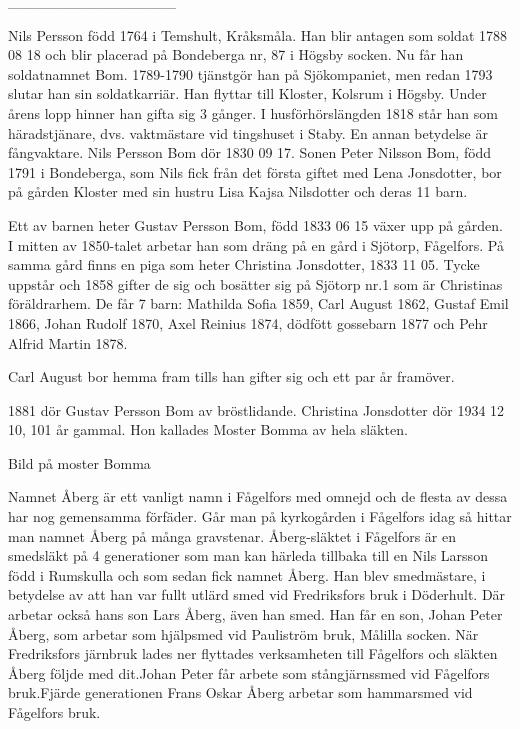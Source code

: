 ________________



Nils Persson född 1764 i Temshult, Kråksmåla. 
Han blir antagen som soldat 1788 08 18 och blir placerad på Bondeberga nr, 87 i Högsby socken. Nu får han soldatnamnet Bom.
1789-1790 tjänstgör han på Sjökompaniet, men redan 1793 slutar han sin soldatkarriär.
Han flyttar till Kloster, Kolsrum i Högsby. Under årens lopp hinner han gifta sig 3 gånger.
I husförhörslängden 1818 står han som häradstjänare, dvs. vaktmästare vid tingshuset i Staby.
En annan betydelse är fångvaktare.
Nils Persson Bom dör 1830 09 17.
Sonen Peter Nilsson Bom, född 1791 i Bondeberga, som Nils fick från det första giftet med Lena Jonsdotter, bor på gården Kloster med sin hustru Lisa Kajsa Nilsdotter och deras 11 barn.


Ett av barnen heter Gustav Persson Bom, född 1833 06 15 växer upp på gården. I mitten av 1850-talet arbetar han som dräng på en gård i Sjötorp, Fågelfors. På samma gård finns en piga som heter Christina Jonsdotter, 1833 11 05. Tycke uppstår och 1858 gifter de sig och bosätter sig på Sjötorp nr.1 som är Christinas föräldrarhem. De får 7 barn:
Mathilda Sofia 1859, Carl August 1862, Gustaf Emil 1866, Johan Rudolf 1870, Axel Reinius 1874, dödfött gossebarn 1877 och Pehr Alfrid Martin 1878.


Carl August bor hemma fram tills han gifter sig och ett par år framöver.


1881 dör Gustav Persson Bom av bröstlidande. Christina Jonsdotter dör 1934 12 10, 101 år gammal. Hon kallades Moster Bomma av hela släkten.


Bild på moster Bomma

 

Namnet Åberg är ett vanligt namn i Fågelfors med omnejd och de flesta av dessa har nog gemensamma förfäder. Går man på kyrkogården i Fågelfors idag så hittar man namnet Åberg på många gravstenar. Åberg-släktet i Fågelfors är en smedsläkt på 4 generationer som man kan härleda tillbaka till en Nils Larsson född i Rumskulla och som sedan fick namnet Åberg. Han blev smedmästare, i betydelse av att han var fullt utlärd smed vid Fredriksfors bruk i Döderhult. Där arbetar också hans son Lars Åberg, även han smed. Han får en son, Johan Peter Åberg, som arbetar som hjälpsmed vid Pauliström bruk, Målilla socken. När Fredriksfors järnbruk lades ner flyttades verksamheten till Fågelfors och släkten Åberg följde med dit.Johan Peter får arbete som stångjärnssmed vid Fågelfors bruk.Fjärde generationen  Frans Oskar Åberg arbetar som hammarsmed vid Fågelfors bruk.  


